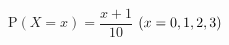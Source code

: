 $\mathrm{P}(X=x)=\dfrac{x+1}{10}$ $(x=0{,}\mkern3mu\mathopen{}1{,}\mkern3mu\mathopen{}2{,}\mkern3mu\mathopen{}3)$
